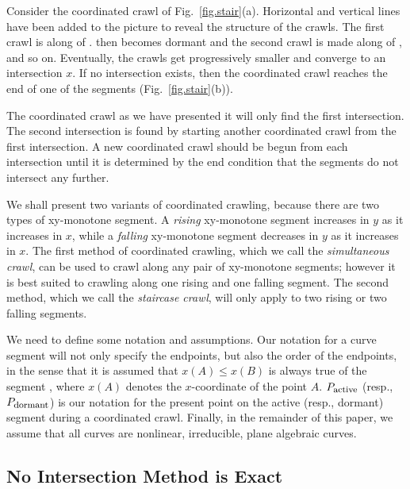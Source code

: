 \begin{example}
\label{eg1}
Consider the coordinated crawl of Fig.~\ref{fig.stair}(a).
Horizontal and vertical lines have been added to the picture 
to reveal the structure of the crawls.
The first crawl is along  of .
 then becomes dormant and the second crawl is made along  of ,
and so on.
Eventually, the crawls get progressively smaller and converge to an intersection $x$.
If no intersection exists, then the coordinated crawl reaches the end of one 
of the segments (Fig.~\ref{fig.stair}(b)).
\end{example}

The coordinated crawl as we have presented it will only find the first intersection.
The second intersection is found by starting another coordinated crawl from the
first intersection.
A new coordinated crawl should be begun from each intersection 
until it is determined by the end condition that the segments do not intersect any further.

We shall present two variants of coordinated crawling, because there are two types
of xy-monotone segment.
A {\em rising} xy-monotone segment increases in $y$ as it increases in $x$, while
a {\em falling} xy-monotone segment decreases in $y$ as it increases in $x$.
The first method of coordinated crawling, which we call the {\em simultaneous crawl}, 
can be used to 
crawl along any pair of xy-monotone segments;
however it is best suited to crawling along one rising and one falling segment.
The second method, which we call the {\em staircase crawl}, will 
only apply to two rising or two falling 
segments.

We need to define some notation and assumptions.
Our notation for a curve segment will not only specify the endpoints,
but also the order of the endpoints, in the sense that it is assumed that
$x(A) \leq x(B)$ is always true of the segment , where
$x(A)$ denotes the $x$-coordinate of the point $A$.
$P_{\mbox{\footnotesize{active}}}$ (resp., $P_{\mbox{\footnotesize{dormant}}}$)
is our notation for the present point on the active (resp., dormant) segment during 
a coordinated crawl. 
Finally, in the remainder of this paper, we assume that all curves are nonlinear, 
irreducible, plane algebraic curves.

\subsection{No Intersection Method is Exact}
\label{sub-exact}

